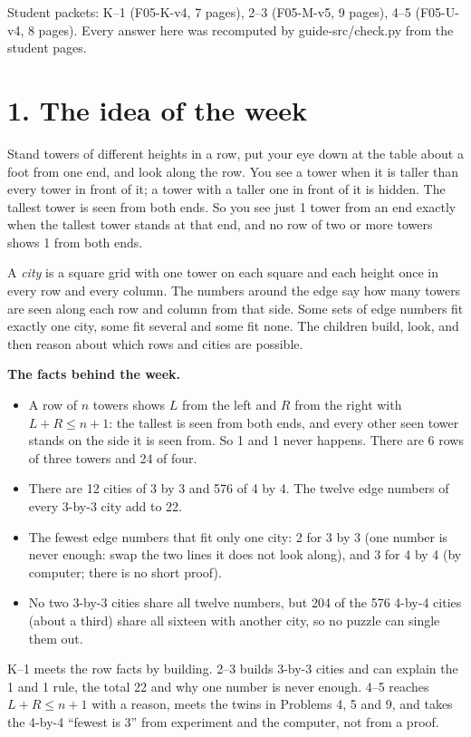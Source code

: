 \documentclass[11pt]{extarticle}
\begin{document}
\RaggedRight

{\color{mute}\small Student packets: K--1 (F05-K-v4, 7 pages), 2--3 (F05-M-v5, 9 pages), 4--5 (F05-U-v4, 8 pages). Every answer here was recomputed by guide-src/check.py from the student pages.}

\section{1. The idea of the week}

Stand towers of different heights in a row, put your eye down at the table about a foot from one end, and look along the row. You see a tower when it is taller than every tower in front of it; a tower with a taller one in front of it is hidden. The tallest tower is seen from both ends. So you see just 1 tower from an end exactly when the tallest tower stands at that end, and no row of two or more towers shows 1 from both ends.

A \emph{city} is a square grid with one tower on each square and each height once in every row and every column. The numbers around the edge say how many towers are seen along each row and column from that side. Some sets of edge numbers fit exactly one city, some fit several and some fit none. The children build, look, and then reason about which rows and cities are possible.

\textbf{The facts behind the week.}
\begin{itemize}
\item A row of $n$ towers shows $L$ from the left and $R$ from the right with $L+R\le n+1$: the tallest is seen from both ends, and every other seen tower stands on the side it is seen from. So 1 and 1 never happens. There are 6 rows of three towers and 24 of four.
\item There are 12 cities of 3 by 3 and 576 of 4 by 4. The twelve edge numbers of every 3-by-3 city add to 22.
\item The fewest edge numbers that fit only one city: 2 for 3 by 3 (one number is never enough: swap the two lines it does not look along), and 3 for 4 by 4 (by computer; there is no short proof).
\item No two 3-by-3 cities share all twelve numbers, but 204 of the 576 4-by-4 cities (about a third) share all sixteen with another city, so no puzzle can single them out.
\end{itemize}
K--1 meets the row facts by building. 2--3 builds 3-by-3 cities and can explain the 1 and 1 rule, the total 22 and why one number is never enough. 4--5 reaches $L+R\le n+1$ with a reason, meets the twins in Problems 4, 5 and 9, and takes the 4-by-4 ``fewest is 3'' from experiment and the computer, not from a proof.
\end{document}
